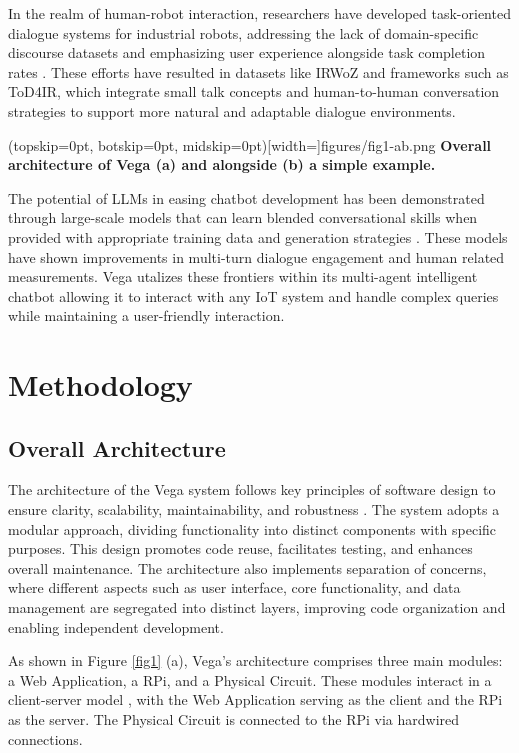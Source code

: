 \documentclass{ieeeaccess}
\begin{document}
In the realm of human-robot interaction, researchers have developed task-oriented dialogue systems for industrial robots, addressing the lack of domain-specific discourse datasets and emphasizing user experience alongside task completion rates \cite{9869659}. These efforts have resulted in datasets like IRWoZ and frameworks such as ToD4IR, which integrate small talk concepts and human-to-human conversation strategies to support more natural and adaptable dialogue environments.

\Figure[t!](topskip=0pt, botskip=0pt,
midskip=0pt)[width=\textwidth]{{figures/fig1-ab.png}}
{ \centering \textbf{Overall architecture of Vega (a) and alongside (b) a simple example.}\label{fig1}}

The potential of LLMs in easing chatbot development has been demonstrated through large-scale models that can learn blended conversational skills when provided with appropriate training data and generation strategies \cite{roller-etal-2021-recipes}. These models have shown improvements in multi-turn dialogue engagement and human related measurements. Vega utalizes these frontiers within its multi-agent intelligent chatbot allowing it to interact with any IoT system and handle complex queries while maintaining a user-friendly interaction.



\section{Methodology}\label{sec:methodology}
\subsection{Overall Architecture}

The architecture of the Vega system follows key principles of software design to ensure clarity, scalability, maintainability, and robustness \cite{taylor2010software}. The system adopts a modular approach, dividing functionality into distinct components with specific purposes. This design promotes code reuse, facilitates testing, and enhances overall maintenance. The architecture also implements separation of concerns, where different aspects such as user interface, core functionality, and data management are segregated into distinct layers, improving code organization and enabling independent development.

As shown in Figure \ref{fig1} (a), Vega's architecture comprises three main modules: a Web Application, a RPi, and a Physical Circuit. These modules interact in a client-server model \cite{tanenbaum2002distributed}, with the Web Application serving as the client and the RPi as the server. The Physical Circuit is connected to the RPi via hardwired connections.
\end{document}

